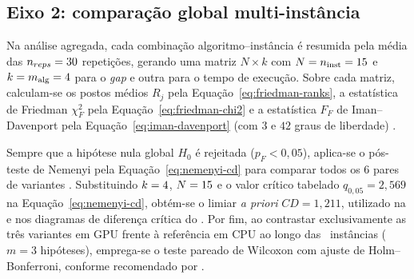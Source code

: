 \subsection{Eixo 2: comparação global multi-instância}\label{sec-342-eixo2}

Na análise agregada, cada combinação algoritmo--instância é resumida pela média das \(n_{reps} = 30\) repetições, gerando uma matriz \(N \times k\) com \(N = n_{\text{inst}} = 15\) e \(k = m_{\text{alg}} = 4\) para o \emph{gap} e outra para o tempo de execução.
Sobre cada matriz, calculam-se os postos médios \(R_j\) pela Equação~\eqref{eq:friedman-ranks}, a estatística de Friedman \(\chi_F^2\) pela Equação~\eqref{eq:friedman-chi2} e a estatística \(F_F\) de Iman--Davenport pela Equação~\eqref{eq:iman-davenport} (com \(3\) e \(42\) graus de liberdade) \autocite{friedman1937use,demsar2006statistical}.

Sempre que a hipótese nula global \(H_0\) é rejeitada (\(p_F < 0{,}05\)), aplica-se o pós-teste de Nemenyi pela Equação~\eqref{eq:nemenyi-cd} para comparar todos os \(6\) pares de variantes \autocite{nemenyi1963distribution}.
Substituindo \(k = 4\), \(N = 15\) e o valor crítico tabelado \(q_{0{,}05} = 2{,}569\) \autocite[Tabela~5]{demsar2006statistical} na Equação~\eqref{eq:nemenyi-cd}, obtém-se o limiar \emph{a priori} \(CD = 1{,}211\), utilizado na  e nos diagramas de diferença crítica do .
Por fim, ao contrastar exclusivamente as três variantes em GPU frente à referência em CPU ao longo das \totalinstancias\ instâncias (\(m = 3\) hipóteses), emprega-se o teste pareado de Wilcoxon com ajuste de Holm--Bonferroni, conforme recomendado por \textcite[Seção~3.2.2]{demsar2006statistical}.

